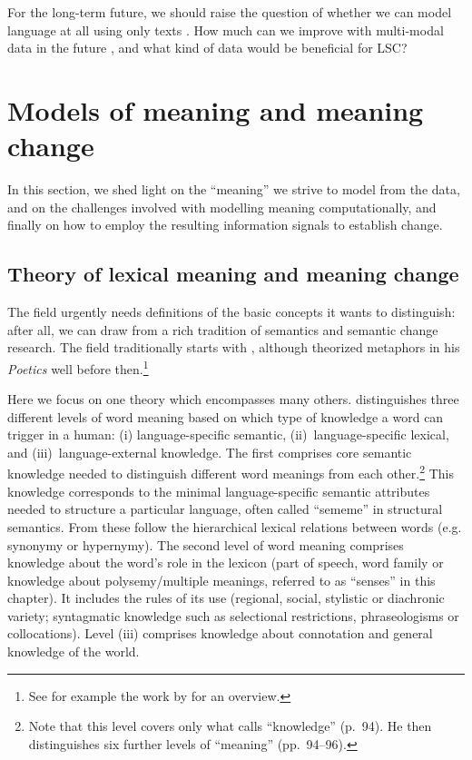 \documentclass[output=paper]{langscibook}
\begin{document}
For the long-term future, we should raise the question of whether we  can model language at all using only texts \citep{bender2020climbing}. How much can we improve with multi-modal data in the future \citep{bruni2012distributional}, and what kind of data would be beneficial for LSC?

\section{Models of meaning and meaning change}
\label{s:theory}


In this section, we shed light on the ``meaning'' we strive to model from the data, and on the challenges involved with modelling meaning computationally, and finally on how to employ the resulting information signals to establish change.

\subsection{Theory of lexical meaning and meaning change}
\label{sec:theorylex}
The field urgently needs definitions of the basic concepts it wants to distinguish: after all, we can draw from a rich tradition of semantics and semantic change research. The field traditionally starts with \citet{reisig1839vorlesungen}, although \citet{aristotle335bc} theorized metaphors in his \emph{Poetics} well before then.\footnote{See for example the work by \citet{mague2005changements} for an overview.}

\begin{sloppypar}
Here we focus on one theory which encompasses many others. \citet[54]{blank97xvi} distinguishes three different levels of word meaning based on which type of knowledge a word can trigger in a human: (i) language-specific semantic, (ii)~language-specific lexical, and (iii)~language-external knowledge. The first comprises core semantic knowledge needed to distinguish different word meanings from each other.\footnote{Note that this level  covers only what \citet{blank97xvi} calls ``knowledge'' (p.~94). He then distinguishes six further levels of ``meaning'' (pp.~94--96).} This knowledge corresponds to the minimal language-specific semantic attributes needed to structure a particular language, often called ``sememe'' in structural semantics. From these follow the hierarchical lexical relations between words (e.g. synonymy or hypernymy). The second level of word meaning comprises knowledge about the word's role in the lexicon (part of speech, word family or knowledge about polysemy\slash multiple meanings, referred to as ``senses'' in this chapter). It includes the rules of its use (regional, social, stylistic or diachronic variety; syntagmatic knowledge such as selectional restrictions, phraseologisms or collocations). Level (iii) comprises knowledge about connotation and general knowledge of the world. 
\end{sloppypar}
\end{document}
